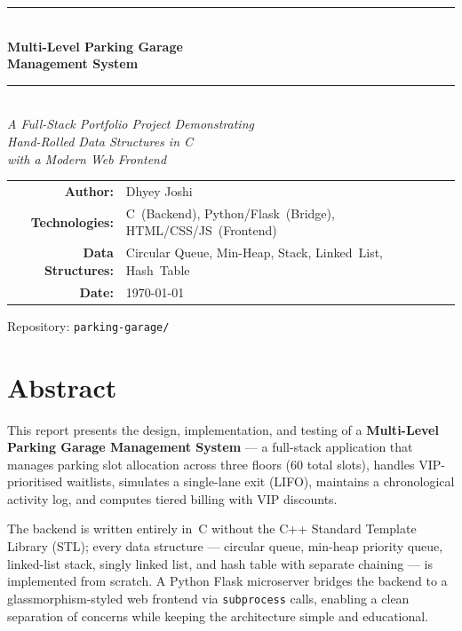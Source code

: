 \documentclass[12pt, a4paper]{report}
\begin{document}
\begin{titlepage}
  \centering
  \vspace*{2cm}

  \rule{\textwidth}{1.5pt}\\[0.4cm]
  {\Huge\bfseries Multi-Level Parking Garage\\[0.3cm] Management System}\\[0.4cm]
  \rule{\textwidth}{1.5pt}\\[1.5cm]

  {\Large\textit{A Full-Stack Portfolio Project Demonstrating\\
  Hand-Rolled Data Structures in C\\
  with a Modern Web Frontend}}\\[2.5cm]

  {\large
  \begin{tabular}{r p{8cm}}
    \textbf{Author:}      & Dhyey Joshi \\[0.3cm]
    \textbf{Technologies:} & C~(Backend), Python/Flask~(Bridge), HTML/CSS/JS~(Frontend) \\[0.3cm]
    \textbf{Data Structures:} & Circular Queue, Min-Heap, Stack, Linked~List, Hash~Table \\[0.3cm]
    \textbf{Date:}         & \today \\
  \end{tabular}
  }

  \vfill
  {\small Repository: \texttt{parking-garage/}}
\end{titlepage}

\tableofcontents
\newpage

\chapter*{Abstract}

This report presents the design, implementation, and testing of a
\textbf{Multi-Level Parking Garage Management System} --- a full-stack
application that manages parking slot allocation across three floors (60
total slots), handles VIP-prioritised waitlists, simulates a single-lane
exit (LIFO), maintains a chronological activity log, and computes
tiered billing with VIP discounts.

The backend is written entirely in~C without the C++ Standard Template
Library (STL); every data structure --- circular queue, min-heap priority
queue, linked-list stack, singly linked list, and hash table with
separate chaining --- is implemented from scratch.  A Python Flask
microserver bridges the backend to a glassmorphism-styled web frontend
via \texttt{subprocess} calls, enabling a clean separation of concerns
while keeping the architecture simple and educational.
\end{document}
